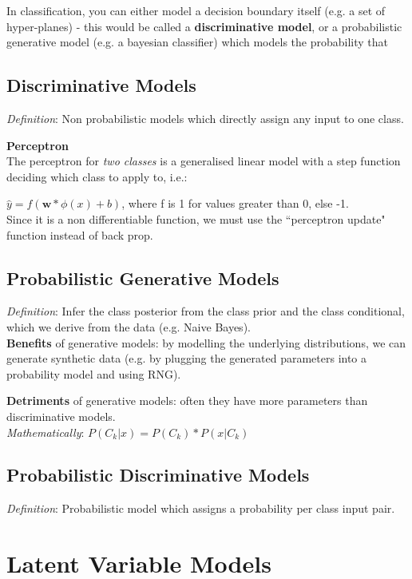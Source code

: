\documentclass[a4paper]{article}
\begin{document}
	In classification, you can either model a decision boundary itself (e.g. a set of hyper-planes) - this would be called a \textbf{discriminative model}, or a probabilistic generative model (e.g. a bayesian classifier) which models the probability that 
	
	\subsection{Discriminative Models}
	\textit{Definition}: Non probabilistic models which directly assign any input to one class.
	
	\textbf{Perceptron} \\
	The perceptron for \textit{two classes} is a generalised linear model with a step function deciding which class to apply to, i.e.:
	
	$\hat{y} = f(\mathbf{w} * \phi(x) + b)$, where f is 1 for values greater than 0, else -1. \\
	Since it is a non differentiable function, we must use the ``perceptron update" function instead of back prop. 
	
	\subsection{Probabilistic Generative Models}
	\textit{Definition}: Infer the class posterior from the class prior and the class conditional, which we derive from the data (e.g. Naive Bayes). \\
	 
	
	\textbf{Benefits} of generative models: by modelling the underlying distributions, we can generate synthetic data (e.g. by plugging the generated parameters into a probability model and using RNG).
	
	\textbf{Detriments} of generative models: often they have more parameters than discriminative models. \\ 
	
	\textit{Mathematically}: $P(C_k | x) = P(C_k) * P(x | C_k)$ \\ 
	
	
	
	\subsection{Probabilistic Discriminative Models}
	\textit{Definition}: Probabilistic model which assigns a probability per class input pair.
	
	
	\clearpage
	\section{Latent Variable Models}
	
\end{document}
